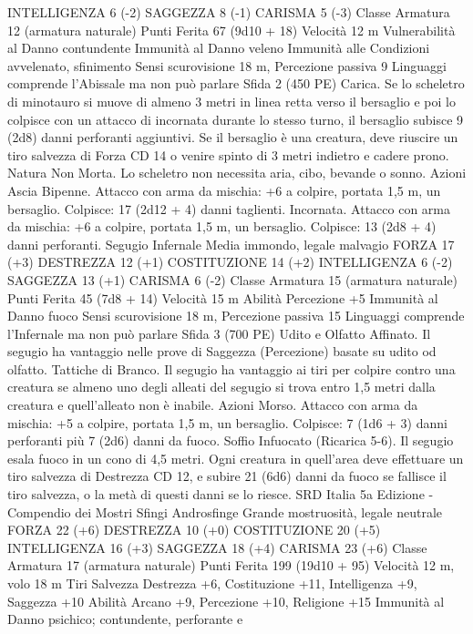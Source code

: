 \begin{multicols}{2}
INTELLIGENZA 6 (-2)
SAGGEZZA 8 (-1)
CARISMA 5 (-3)
Classe Armatura 12 (armatura naturale)
Punti Ferita 67 (9d10 + 18)
Velocità 12 m
Vulnerabilità al Danno contundente
Immunità al Danno veleno
Immunità alle Condizioni avvelenato, sfinimento
Sensi scurovisione 18 m, Percezione passiva 9
Linguaggi comprende l’Abissale ma non può parlare
Sfida 2 (450 PE)
Carica. Se lo scheletro di minotauro si muove di almeno 3 metri
in linea retta verso il bersaglio e poi lo colpisce con un attacco di
incornata durante lo stesso turno, il bersaglio subisce 9 (2d8)
danni perforanti aggiuntivi. Se il bersaglio è una creatura, deve
riuscire un tiro salvezza di Forza CD 14 o venire spinto di 3
metri indietro e cadere prono.
Natura Non Morta. Lo scheletro non necessita aria, cibo,
bevande o sonno.
Azioni
Ascia Bipenne. Attacco con arma da mischia: +6 a colpire,
portata 1,5 m, un bersaglio.
Colpisce: 17 (2d12 + 4) danni taglienti.
Incornata. Attacco con arma da mischia: +6 a colpire, portata
1,5 m, un bersaglio.
Colpisce: 13 (2d8 + 4) danni perforanti.
Segugio Infernale
Media immondo, legale malvagio
FORZA 17 (+3)
DESTREZZA 12 (+1)
COSTITUZIONE 14 (+2)
INTELLIGENZA 6 (-2)
SAGGEZZA 13 (+1)
CARISMA 6 (-2)
Classe Armatura 15 (armatura naturale)
Punti Ferita 45 (7d8 + 14)
Velocità 15 m
Abilità Percezione +5
Immunità al Danno fuoco
Sensi scurovisione 18 m, Percezione passiva 15
Linguaggi comprende l’Infernale ma non può parlare
Sfida 3 (700 PE)
Udito e Olfatto Affinato. Il segugio ha vantaggio nelle prove di
Saggezza (Percezione) basate su udito od olfatto.
Tattiche di Branco. Il segugio ha vantaggio ai tiri per colpire
contro una creatura se almeno uno degli alleati del segugio si
trova entro 1,5 metri dalla creatura e quell’alleato non è inabile.
Azioni
Morso. Attacco con arma da mischia: +5 a colpire, portata 1,5
m, un bersaglio.
Colpisce: 7 (1d6 + 3) danni perforanti più 7 (2d6) danni da
fuoco.
Soffio Infuocato (Ricarica 5-6). Il segugio esala fuoco in un
cono di 4,5 metri. Ogni creatura in quell’area deve effettuare un
tiro salvezza di Destrezza CD 12, e subire 21 (6d6) danni da
fuoco se fallisce il tiro salvezza, o la metà di questi danni se lo
riesce.
SRD Italia 5a Edizione - Compendio dei Mostri
Sfingi
Androsfinge
Grande mostruosità, legale neutrale
FORZA 22 (+6)
DESTREZZA 10 (+0)
COSTITUZIONE 20 (+5)
INTELLIGENZA 16 (+3)
SAGGEZZA 18 (+4)
CARISMA 23 (+6)
Classe Armatura 17 (armatura naturale)
Punti Ferita 199 (19d10 + 95)
Velocità 12 m, volo 18 m
Tiri Salvezza Destrezza +6, Costituzione +11, Intelligenza +9,
Saggezza +10
Abilità Arcano +9, Percezione +10, Religione +15
Immunità al Danno psichico; contundente, perforante e

\end{multicols}

